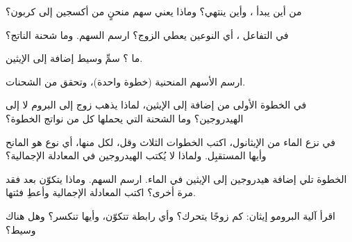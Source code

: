 \begin{exercise}[$\star$]\label{exo:g12:curly-arrows:3}
من أين يبدأ ، وأين ينتهي؟ وماذا يعني سهم منحنٍ
من   أكسجين إلى  كربون؟
\end{exercise}

\begin{exercise}[$\star$]\label{exo:g12:curly-arrows:4}
في التفاعل ، أي النوعين يعطي الزوج؟
ارسم السهم. وما شحنة الناتج؟
\end{exercise}

\begin{exercise}[$\star$]\label{exo:g12:curly-arrows:5}
ما ؟ سمِّ وسيط إضافة
 إلى الإيثين.
\end{exercise}

\begin{exercise}[$\star\star$]\label{exo:g12:curly-arrows:6}
ارسم الأسهم المنحنية 
 (خطوة واحدة)، وتحقق من الشحنات.
\end{exercise}

\begin{exercise}[$\star\star$]\label{exo:g12:curly-arrows:7}
في الخطوة الأولى من إضافة  إلى الإيثين، لماذا يذهب
زوج  إلى البروم لا إلى الهيدروجين؟ وما الشحنة التي
يحملها كل  من نواتج الخطوة؟
\end{exercise}

\begin{exercise}[$\star\star$]\label{exo:g12:curly-arrows:8}
في نزع الماء من الإيثانول، اكتب الخطوات الثلاث وقل، لكل منها،
أي نوع هو المانح وأيها المستقبِل. ولماذا لا يُكتب 
الهيدروجين في المعادلة الإجمالية؟
\end{exercise}

\begin{exercise}[$\star\star$]\label{exo:g12:curly-arrows:9}
الخطوة  تلي
إضافة  هيدروجين إلى الإيثين في الماء. ارسم السهم. وماذا
يتكوّن بعد فقد  مرة أخرى؟ اكتب المعادلة الإجمالية
وأعطِ فئتها.
\end{exercise}

\begin{exercise}[$\star\star$]\label{exo:g12:curly-arrows:10}
اقرأ آلية  البرومو إيثان: كم زوجًا
يتحرك؟ وأي رابطة تتكوّن، وأيها تنكسر؟ وهل هناك وسيط؟
\end{exercise}

